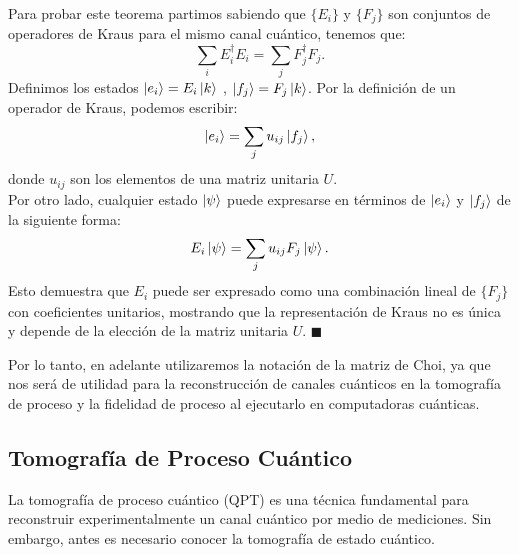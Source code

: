 \documentclass[letterpaper,12pt]{thesisECFM}
\theoremstyle{plain}
\theoremstyle{definition}
\theoremstyle{definition}
\theoremstyle{remark}
\newcommand{\1}{\mathbb{1}}
\begin{document}
Para probar este teorema partimos sabiendo que  $\{E_i\}$ y $\{F_j\}$ son conjuntos de operadores de Kraus para el mismo canal cuántico, tenemos que:
\begin{equation}
   \sum_i E_i^\dagger E_i = \sum_j F_j^\dagger F_j. 
\end{equation}
Definimos los estados $\ket{e_i} = E_i \ket{k}$ , $\ket{f_j} = F_j \ket{k}$. Por la definición de un operador de Kraus, podemos escribir:
\begin{equation}
  \ket{e_i} = \sum_j u_{ij} \ket{f_j},  
\end{equation} 
donde $u_{ij}$ son los elementos de una matriz unitaria $U$.\\
Por otro lado, cualquier estado $\ket{\psi}$ puede expresarse en términos de $\ket{e_i}$ y $\ket{f_j}$ de la siguiente forma:
\begin{equation}
E_i \ket{\psi} = \sum_j u_{ij} F_j \ket{\psi}.
\end{equation}
Esto demuestra que $E_i$ puede ser expresado como una combinación lineal de $\{F_j\}$ con coeficientes unitarios, mostrando que la representación de Kraus no es única y depende de la elección de la matriz unitaria $U$. $\blacksquare$

Por lo tanto, en adelante utilizaremos la notación de la matriz de Choi, ya que nos será de utilidad para la reconstrucción de canales cuánticos en la tomografía de proceso y la fidelidad de proceso al ejecutarlo en computadoras cuánticas.



\subsection{Tomografía de Proceso Cuántico} %
La tomografía de proceso cuántico (QPT) es una técnica fundamental para reconstruir experimentalmente un canal cuántico por medio de mediciones. Sin embargo, antes es necesario conocer la tomografía de estado cuántico.  
\end{document}

